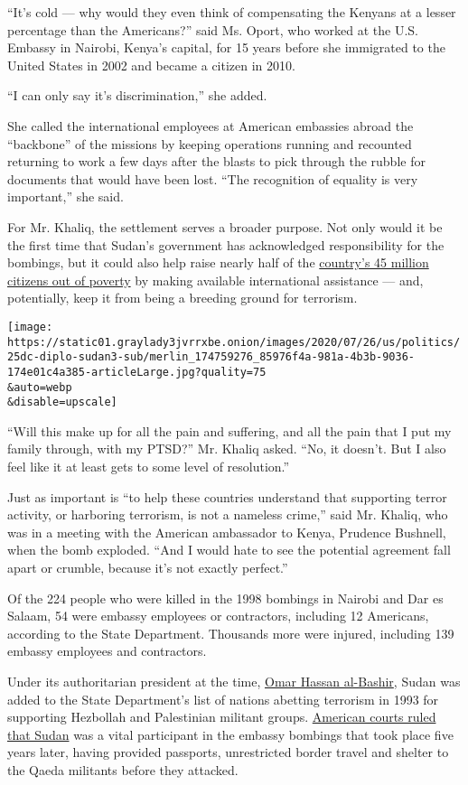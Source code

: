 ``It's cold --- why would they even think of compensating the Kenyans at
a lesser percentage than the Americans?'' said Ms. Oport, who worked at
the U.S. Embassy in Nairobi, Kenya's capital, for 15 years before she
immigrated to the United States in 2002 and became a citizen in 2010.

``I can only say it's discrimination,'' she added.

She called the international employees at American embassies abroad the
``backbone'' of the missions by keeping operations running and recounted
returning to work a few days after the blasts to pick through the rubble
for documents that would have been lost. ``The recognition of equality
is very important,'' she said.

For Mr. Khaliq, the settlement serves a broader purpose. Not only would
it be the first time that Sudan's government has acknowledged
responsibility for the bombings, but it could also help raise nearly
half of the
\href{https://www.cia.gov/library/publications/the-world-factbook/geos/su.html}{country's
45 million citizens out of poverty} by making available international
assistance --- and, potentially, keep it from being a breeding ground
for terrorism.

\texttt{[image: https://static01.graylady3jvrrxbe.onion/images/2020/07/26/us/politics/25dc-diplo-sudan3-sub/merlin\_174759276\_85976f4a-981a-4b3b-9036-174e01c4a385-articleLarge.jpg?quality=75\\\&auto=webp\\\&disable=upscale]}

``Will this make up for all the pain and suffering, and all the pain
that I put my family through, with my PTSD?'' Mr. Khaliq asked. ``No, it
doesn't. But I also feel like it at least gets to some level of
resolution.''

Just as important is ``to help these countries understand that
supporting terror activity, or harboring terrorism, is not a nameless
crime,'' said Mr. Khaliq, who was in a meeting with the American
ambassador to Kenya, Prudence Bushnell, when the bomb exploded. ``And I
would hate to see the potential agreement fall apart or crumble, because
it's not exactly perfect.''

Of the 224 people who were killed in the 1998 bombings in Nairobi and
Dar es Salaam, 54 were embassy employees or contractors, including 12
Americans, according to the State Department. Thousands more were
injured, including 139 embassy employees and contractors.

Under its authoritarian president at the time,
\href{https://www.nytimes3xbfgragh.onion/2020/07/30/world/middleeast/darfur-sudan.html}{Omar
Hassan al-Bashir}, Sudan was added to the State Department's list of
nations abetting terrorism in 1993 for supporting Hezbollah and
Palestinian militant groups.
\href{https://www.nytimes3xbfgragh.onion/2020/05/18/us/supreme-court-sudan-terrorism.html}{American
courts ruled that Sudan} was a vital participant in the embassy bombings
that took place five years later, having provided passports,
unrestricted border travel and shelter to the Qaeda militants before
they attacked.

